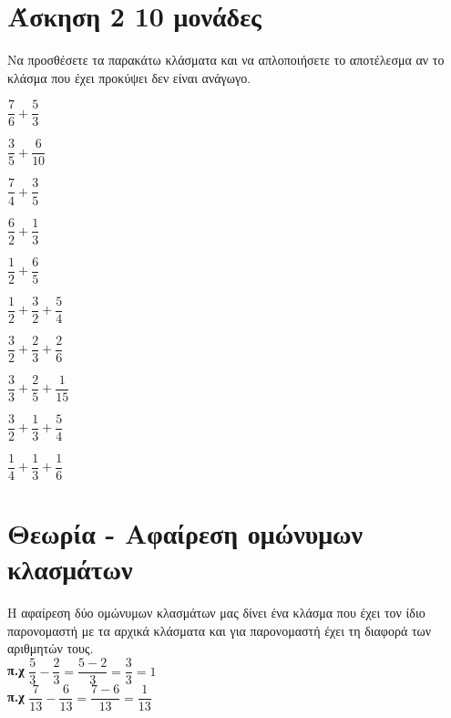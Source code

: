 \documentclass[a4paper,10pt]{report}
\begin{document}
\section*{Άσκηση 2  \hfill \small{10 μονάδες}}
Να προσθέσετε τα παρακάτω κλάσματα και να απλοποιήσετε το αποτέλεσμα αν το κλάσμα 
που έχει προκύψει δεν είναι ανάγωγο.
\begin{enumerate}[1)]
\begin{multicols}{2}
 \item $\dfrac{7}{6}+\dfrac{5}{3}$
 \item $\dfrac{3}{5}+\dfrac{6}{10}$
 \item $\dfrac{7}{4}+\dfrac{3}{5}$
 \item $\dfrac{6}{2}+\dfrac{1}{3}$
 \item $\dfrac{1}{2}+\dfrac{6}{5}$
 \item $\dfrac{1}{2}+\dfrac{3}{2}+\dfrac{5}{4}$
 \item $\dfrac{3}{2}+\dfrac{2}{3}+\dfrac{2}{6}$
 \item $\dfrac{3}{3}+\dfrac{2}{5}+\dfrac{1}{15}$
 \item $\dfrac{3}{2}+\dfrac{1}{3}+\dfrac{5}{4}$
 \item $\dfrac{1}{4}+\dfrac{1}{3}+\dfrac{1}{6}$
\end{multicols}
\end{enumerate}

\section*{Θεωρία - Αφαίρεση ομώνυμων κλασμάτων\hfill \small{}}
Η αφαίρεση δύο ομώνυμων κλασμάτων μας δίνει ένα κλάσμα που έχει τον ίδιο παρονομαστή με τα αρχικά 
κλάσματα και για παρονομαστή έχει τη διαφορά των αριθμητών τους.  \\
\textbf{π.χ} $\dfrac{5}{3}-\dfrac{2}{3}=\dfrac{5-2}{3}=\dfrac{3}{3}=1$\\
\textbf{π.χ} $\dfrac{7}{13}-\dfrac{6}{13}=\dfrac{7-6}{13}=\dfrac{1}{13}$
\end{document}
